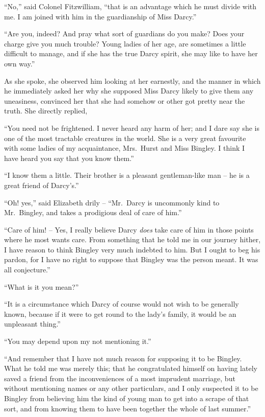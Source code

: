 “No,” said Colonel Fitzwilliam, “that is an advantage
which he must divide with me. I am joined with him in
the guardianship of Miss Darcy.”

“Are you, indeed? And pray what sort of gua\-rdians
do you make? Does your charge give you much trouble?
Young ladies of her age, are sometimes a little difficult
to manage, and if she has the true Darcy spirit, she may
like to have her own way.”

As she spoke, she observed him looking at her earnestly,
and the manner in which he immediately asked her why
she supposed Miss Darcy likely to give them any uneasiness,
convinced her that she had somehow or other got
pretty near the truth. She directly replied,

“You need not be frightened. I never heard any harm
of her; and I dare say she is one of the most tractable
creatures in the world. She is a very great favourite with
some ladies of my acquaintance, Mrs.\ Hurst and Miss
Bingley. I think I have heard you say that you know
them.”

“I know them a little. Their brother is a pleasant
gentle\-man-like man -- he is a great friend of Darcy’s.”

“Oh! yes,” said Elizabeth drily -- “Mr.\ Darcy is
uncommonly kind to Mr.\ Bingley, and takes a prodigious
deal of care of him.”

“Care of him! -- Yes, I really believe Darcy \textit{does} take
care of him in those points where he most wants care.
From something that he told me in our journey hither,
I have reason to think Bingley very much indebted to
him. But I ought to beg his pardon, for I have no right
to suppose that Bingley was the person meant. It was
all conjecture.”

“What is it you mean?”

“It is a circumstance which Darcy of course would
not wish to be generally known, because if it were to
get round to the lady’s family, it would be an unpleasant
thing.”

“You may depend upon my not mentioning it.”

“And remember that I have not much reason for
supposing it to be Bingley. What he told me was merely
this; that he congratulated himself on having lately saved
a friend from the inconveniences of a most imprudent
marriage, but without mentioning names or any other
particulars, and I only suspected it to be Bingley from
believing him the kind of young man to get into a scrape
of that sort, and from knowing them to have been together
the whole of last summer.”

